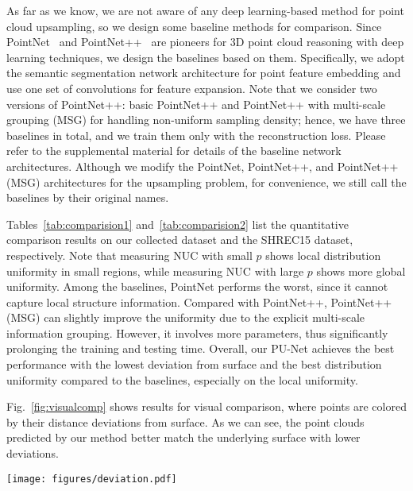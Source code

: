 As far as we know, we are not aware of any deep learning-based method for point cloud upsampling, so we design some baseline methods for comparison. 
Since PointNet~\cite{qi2016pointnet} and PointNet++~\cite{qi2017pointnet++} are pioneers for 3D point cloud reasoning with deep learning techniques, we design the baselines based on them.
Specifically, we adopt the semantic segmentation network architecture for point feature embedding and use one set of convolutions for feature expansion. 
Note that we consider two versions of PointNet++: basic PointNet++ and PointNet++ with multi-scale grouping (MSG) for handling non-uniform sampling density; hence, we have three baselines in total, and we train them only with the reconstruction loss.
Please refer to the supplemental material for details of the baseline network architectures.
Although we modify the PointNet, PointNet++, and PointNet++(MSG) architectures for the upsampling problem, for convenience, we still call the baselines by their original names.

Tables~\ref{tab:comparision1} and~\ref{tab:comparision2} list the quantitative comparison results on our collected dataset and the SHREC15 dataset, respectively.
Note that measuring NUC with small $p$ shows local distribution uniformity in small regions, while measuring NUC with large $p$ shows more global uniformity.
Among the baselines, PointNet performs the worst, since it cannot capture local structure information. 
Compared with PointNet++, PointNet++(MSG) can slightly improve the uniformity due to the explicit multi-scale information grouping.  
However, it involves more parameters, thus significantly prolonging the training and testing time.
Overall, our PU-Net achieves the best performance with the lowest deviation from surface and the best distribution uniformity compared to the baselines, especially on the local uniformity.


Fig.~\ref{fig:visualcomp} shows results for visual comparison, where points are colored by their distance deviations from surface.
As we can see, the point clouds predicted by our method better match the underlying surface with lower deviations.  

\begin{figure*}[t]
	\centering
	\texttt{[image: figures/deviation.pdf]}\vspace{1mm}
	\caption{Visual comparison on samples from our collected dataset (top row) and SHREC (bottom row).
The colors on points (see color map) reveal the surface distance errors, where blue indicates low error and red indicates high error.}
	\label{fig:visualcomp}\vspace{-2mm}
\end{figure*}



